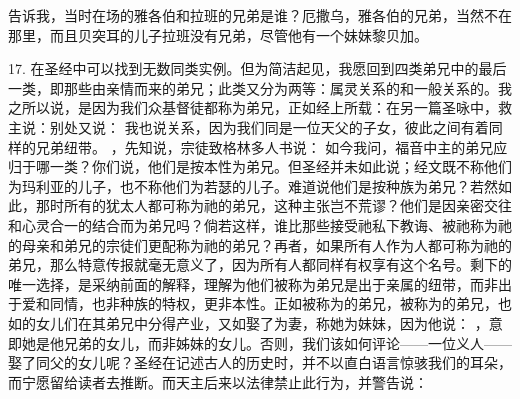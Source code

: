 告诉我，当时在场的雅各伯和拉班的兄弟是谁？厄撒乌，雅各伯的兄弟，当然不在那里，而且贝突耳的儿子拉班没有兄弟，尽管他有一个妹妹黎贝加。\par

17. 在圣经中可以找到无数同类实例。但为简洁起见，我愿回到四类弟兄中的最后一类，即那些由亲情而来的弟兄；此类又分为两等：属灵关系的和一般关系的。我之所以说，是因为我们众基督徒都称为弟兄，正如经上所载：在另一篇圣咏中，救主说：别处又说： 我也说关系，因为我们同是一位天父的子女，彼此之间有着同样的兄弟纽带。 ，先知说，宗徒致格林多人书说： 如今我问，福音中主的弟兄应归于哪一类？你们说，他们是按本性为弟兄。但圣经并未如此说；经文既不称他们为玛利亚的儿子，也不称他们为若瑟的儿子。难道说他们是按种族为弟兄？若然如此，那时所有的犹太人都可称为祂的弟兄，这种主张岂不荒谬？他们是因亲密交往和心灵合一的结合而为弟兄吗？倘若这样，谁比那些接受祂私下教诲、被祂称为祂的母亲和弟兄的宗徒们更配称为祂的弟兄？再者，如果所有人作为人都可称为祂的弟兄，那么特意传报就毫无意义了，因为所有人都同样有权享有这个名号。剩下的唯一选择，是采纳前面的解释，理解为他们被称为弟兄是出于亲属的纽带，而非出于爱和同情，也非种族的特权，更非本性。正如被称为的弟兄，被称为的弟兄，也如的女儿们在其弟兄中分得产业，又如娶了为妻，称她为妹妹，因为他说： ，意即她是他兄弟的女儿，而非姊妹的女儿。否则，我们该如何评论——一位义人——娶了同父的女儿呢？圣经在记述古人的历史时，并不以直白语言惊骇我们的耳朵，而宁愿留给读者去推断。而天主后来以法律禁止此行为，并警告说： \par


